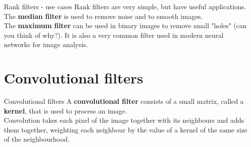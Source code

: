 \documentclass[9pt, aspectratio=169]{beamer}
\begin{document}
\begin{frame}
    {Rank filters - use cases}
    Rank filters are very simple, but have useful applications.\\

    The \textbf{median filter} is used to remove noise and to smooth images.\\
    \pause
    \vspace{1em}
    The \textbf{maximum filter} can be used in binary images to remove  small "holes" (can you think of why?). It is also a very common filter used in modern neural networks for image analysis.\\
\end{frame}

\section{Convolutional filters}

\begin{frame}
    {Convolutional filters}
    A \textbf{convolutional filter} consists of a small matrix, called a \textbf{kernel}, that is used to process an image.\\

    Convolution takes each pixel of the image together with its neighbours and adds them together, weighting each neighbour by the value of a kernel of the same size of the neighbourhood.

\end{frame}
\end{document}
